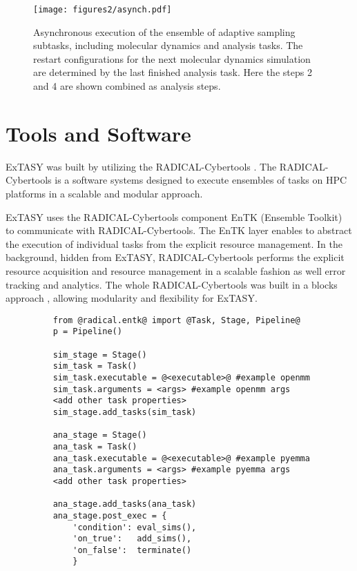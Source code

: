 {\begin{figure}[h]
  \centering
  \texttt{[image: figures2/asynch.pdf]}
  \caption{Asynchronous execution of the ensemble of adaptive sampling subtasks, including molecular dynamics and analysis tasks. The restart configurations for the next molecular dynamics simulation are determined by the last finished analysis task. Here the steps 2 and 4 are shown combined as analysis steps.}
  \label{fig:asynch}
\end{figure}



\section{\label{sec:Tools}Tools and Software}

ExTASY was built by utilizing the RADICAL-Cybertools \cite{Balasubramanian2019rct}. The RADICAL-Cybertools is a software systems designed to execute ensembles of tasks on HPC platforms in a scalable and modular approach.

ExTASY uses the RADICAL-Cybertools component EnTK (Ensemble Toolkit)
\cite{entk-icpp-2016, balasubramanian2018harnessing} to communicate with RADICAL-Cybertools. The EnTK layer enables to abstract the execution of individual tasks from the explicit resource
management. In the background, hidden from ExTASY, RADICAL-Cybertools performs the explicit resource acquisition and resource management in a scalable fashion as well error tracking and analytics. The whole RADICAL-Cybertools was built in a blocks approach \cite{turilli2018building}, allowing modularity and flexibility for ExTASY.


\begin{figure}[h!]
    \begin{lstlisting}
    from @radical.entk@ import @Task, Stage, Pipeline@
    p = Pipeline()

    sim_stage = Stage()   
    sim_task = Task()
    sim_task.executable = @<executable>@ #example openmm
    sim_task.arguments = <args> #example openmm args
    <add other task properties>
    sim_stage.add_tasks(sim_task)
    
    ana_stage = Stage()
    ana_task = Task()
    ana_task.executable = @<executable>@ #example pyemma
    ana_task.arguments = <args> #example pyemma args
    <add other task properties>
    
    ana_stage.add_tasks(ana_task)
    ana_stage.post_exec = {
        'condition': eval_sims(),
        'on_true':   add_sims(),
        'on_false':  terminate()
        }
    

\end{lstlisting}
\end{figure}}
